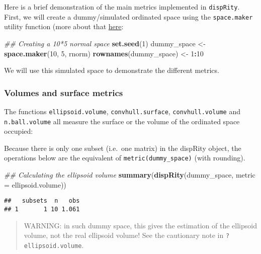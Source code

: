 \documentclass[
]{book}
\newenvironment{Shaded}{\begin{snugshade}}{\end{snugshade}}
\newcommand{\CommentTok}[1]{\textcolor[rgb]{0.56,0.35,0.01}{\textit{#1}}}
\newcommand{\DataTypeTok}[1]{\textcolor[rgb]{0.13,0.29,0.53}{#1}}
\newcommand{\DecValTok}[1]{\textcolor[rgb]{0.00,0.00,0.81}{#1}}
\newcommand{\KeywordTok}[1]{\textcolor[rgb]{0.13,0.29,0.53}{\textbf{#1}}}
\newcommand{\NormalTok}[1]{#1}
\newcommand{\OperatorTok}[1]{\textcolor[rgb]{0.81,0.36,0.00}{\textbf{#1}}}
\newcommand{\StringTok}[1]{\textcolor[rgb]{0.31,0.60,0.02}{#1}}
\begin{document}
Here is a brief demonstration of the main metrics implemented in \texttt{dispRity}.
First, we will create a dummy/simulated ordinated space using the \texttt{space.maker} utility function (more about that \protect\hyperlink{space.maker}{here}:

\begin{Shaded}
\begin{Highlighting}[]
\CommentTok{\#\# Creating a 10*5 normal space}
\KeywordTok{set.seed}\NormalTok{(}\DecValTok{1}\NormalTok{)}
\NormalTok{dummy\_space \textless{}{-}}\StringTok{ }\KeywordTok{space.maker}\NormalTok{(}\DecValTok{10}\NormalTok{, }\DecValTok{5}\NormalTok{, rnorm)}
\KeywordTok{rownames}\NormalTok{(dummy\_space) \textless{}{-}}\StringTok{ }\DecValTok{1}\OperatorTok{:}\DecValTok{10}
\end{Highlighting}
\end{Shaded}

We will use this simulated space to demonstrate the different metrics.

\hypertarget{volumes-and-surface-metrics}{%
\subsubsection{Volumes and surface metrics}\label{volumes-and-surface-metrics}}

The functions \texttt{ellipsoid.volume}, \texttt{convhull.surface}, \texttt{convhull.volume} and \texttt{n.ball.volume} all measure the surface or the volume of the ordinated space occupied:

Because there is only one subset (i.e.~one matrix) in the dispRity object, the operations below are the equivalent of \texttt{metric(dummy\_space)} (with rounding).

\begin{Shaded}
\begin{Highlighting}[]
\CommentTok{\#\# Calculating the ellipsoid volume}
\KeywordTok{summary}\NormalTok{(}\KeywordTok{dispRity}\NormalTok{(dummy\_space, }\DataTypeTok{metric =}\NormalTok{ ellipsoid.volume))}
\end{Highlighting}
\end{Shaded}

\begin{verbatim}
##   subsets  n   obs
## 1       1 10 1.061
\end{verbatim}

\begin{quote}
WARNING: in such dummy space, this gives the estimation of the ellipsoid volume, not the real ellipsoid volume! See the cautionary note in \texttt{?ellipsoid.volume}.
\end{quote}
\end{document}
